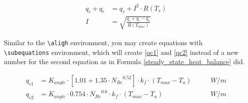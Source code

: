 \begin{align}
	q_c {+} q_r &= q_s + I^2{\cdot}R \left(T_{s} \right)\\
	I &= \sqrt{\frac{q_c{+}q_r{-}q_s}{R \left(T_{max} \right)}} 
	\label{steady_state_heat_balance}
\end{align}

Similar to the {\verb|\aligh|} environment, you may create equations with {\verb|\subequations|} environment, which will create \ref{qc1} and \ref{qc2} instead of a new number for the second equation as in Formula \ref{steady_state_heat_balance} did.

\begin{subequations}
	\begin{align}
	q_{c1} &= K_{angle}{\cdot}\left[1.01{+}1.35{\cdot}{N_{Re}}^{0.52} \right] {\cdot} k_f{\cdot}\left(T_{max}{-}T_a\right) \qquad &W/m \label{qc1}\\ 
	q_{c2} &= K_{angle}{\cdot}0.754{\cdot}{N_{Re}}^{0.6} {\cdot} k_f{\cdot}\left(T_{max}{-}T_a\right) \qquad &W/m \label{qc2}
	\end{align}
\end{subequations}

